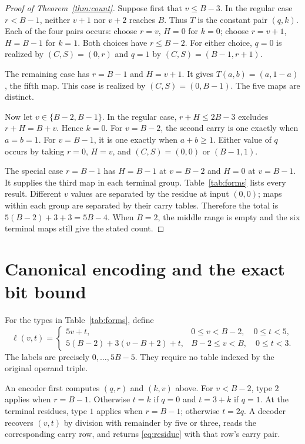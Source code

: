 \documentclass[11pt,a4paper]{article}
\theoremstyle{definition}\newtheorem{definition}[theorem]{Definition}
\begin{document}
\begin{proof}[Proof of Theorem~\ref{thm:count}]
Suppose first that $v\leq B-3$. In the regular case $r<B-1$, neither
$v+1$ nor $v+2$ reaches $B$. Thus $T$ is the constant pair $(q,k)$.
Each of the four pairs occurs: choose $r=v$, $H=0$ for $k=0$;
choose $r=v+1$, $H=B-1$ for $k=1$. Both choices have $r\leq B-2$.
For either choice, $q=0$ is realized by $(C,S)=(0,r)$ and $q=1$
by $(C,S)=(B-1,r+1)$.

The remaining case has $r=B-1$ and $H=v+1$. It gives
$T(a,b)=(a,1-a)$, the fifth map. This case is realized by
$(C,S)=(0,B-1)$. The five maps are distinct.

Now let $v\in\{B-2,B-1\}$. In the regular case,
$r+H\leq2B-3$ excludes $r+H=B+v$. Hence $k=0$.
For $v=B-2$, the second carry is one exactly when $a=b=1$.
For $v=B-1$, it is one exactly when $a+b\geq1$.
Either value of $q$ occurs by taking $r=0$, $H=v$, and
$(C,S)=(0,0)$ or $(B-1,1)$.

The special case $r=B-1$ has $H=B-1$ at $v=B-2$ and $H=0$
at $v=B-1$. It supplies the third map in each terminal group.
Table~\ref{tab:forms} lists every result. Different $v$ values are
separated by the residue at input $(0,0)$; maps within each group are
separated by their carry tables. Therefore the total is
$5(B-2)+3+3=5B-4$. When $B=2$, the middle range is empty and the
six terminal maps still give the stated count.
\end{proof}

\section{Canonical encoding and the exact bit bound}
For the types in Table~\ref{tab:forms}, define
\begin{equation}\label{eq:label}
 \ell(v,t)=
 \begin{cases}
 5v+t,&0\leq v<B-2,\quad 0\leq t<5,\\
 5(B-2)+3(v-B+2)+t,&B-2\leq v<B,\quad 0\leq t<3.
 \end{cases}
\end{equation}
The labels are precisely $0,\ldots,5B-5$. They require no table indexed
by the original operand triple.

An encoder first computes $(q,r)$ and $(k,v)$ above. For $v<B-2$,
type $2$ applies when $r=B-1$. Otherwise $t=k$ if $q=0$ and
$t=3+k$ if $q=1$. At the terminal residues, type $1$ applies when
$r=B-1$; otherwise $t=2q$. A decoder recovers $(v,t)$ by division
with remainder by five or three, reads the corresponding carry row,
and returns \eqref{eq:residue} with that row's carry pair.
\end{document}
